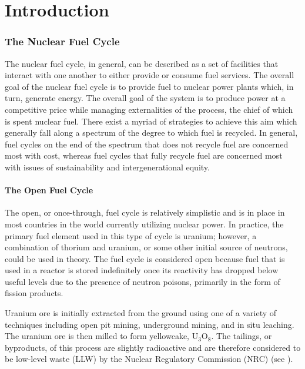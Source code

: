 \chapter{Introduction}\label{ch:intro}

\subsection{The Nuclear Fuel Cycle}

The nuclear fuel cycle, in general, can be described as a set of facilities that
interact with one another to either provide or consume fuel services. The
overall goal of the nuclear fuel cycle is to provide fuel to nuclear power
plants which, in turn, generate energy. The overall goal of the system is to
produce power at a competitive price while managing externalities of the
process, the chief of which is spent nuclear fuel. There exist a myriad of
strategies to achieve this aim which generally fall along a spectrum of the
degree to which fuel is recycled. In general, fuel cycles on the end of the
spectrum that does not recycle fuel are concerned most with cost, whereas fuel
cycles that fully recycle fuel are concerned most with issues of sustainability
and intergenerational equity.

\subsubsection{The Open Fuel Cycle}

The open, or once-through, fuel cycle is relatively simplistic and is in place
in most countries in the world currently utilizing nuclear power. In practice,
the primary fuel element used in this type of cycle is uranium; however, a
combination of thorium and uranium, or some other initial source of neutrons,
could be used in theory. The fuel cycle is considered open because fuel that is
used in a reactor is stored indefinitely once its reactivity has dropped below
useful levels due to the presence of neutron poisons, primarily in the form of
fission products.

Uranium ore is initially extracted from the ground using one of a variety of
techniques including open pit mining, underground mining, and in situ
leaching. The uranium ore is then milled to form yellowcake,
$\mathrm{U_3O_8}$. The tailings, or byproducts, of this process are slightly
radioactive and are therefore considered to be low-level waste (LLW) by the
Nuclear Regulatory Commission (NRC) (see \citet{nrc_10_1985}). 

